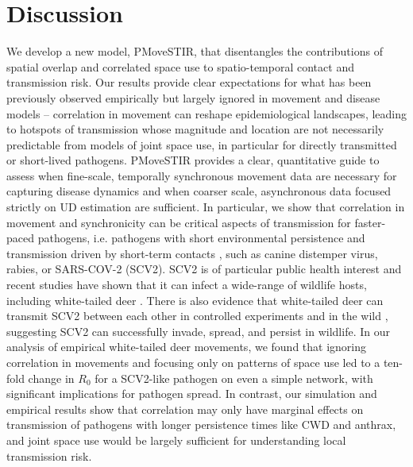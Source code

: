 \documentclass[letterpaper]{article}
\begin{document}
\section*{Discussion}

We develop a new model, PMoveSTIR, that disentangles the contributions of spatial overlap and correlated space use to spatio-temporal contact and transmission risk. Our results provide clear expectations for what has been previously observed empirically but largely ignored in movement and disease models -- correlation in movement can reshape epidemiological landscapes, leading to hotspots of transmission whose magnitude and location are not necessarily predictable from models of joint space use, in particular for directly transmitted or short-lived pathogens.  
PMoveSTIR provides a clear, quantitative guide to assess when fine-scale, temporally synchronous movement data are necessary for capturing disease dynamics and when coarser scale, asynchronous data focused strictly on UD estimation are sufficient. 
In particular, we show that correlation in movement and synchronicity can be critical aspects of transmission for faster-paced pathogens, i.e. pathogens with short environmental persistence and transmission driven by short-term contacts \citep[cf.][]{Dougherty2018,Manlove2022}, such as canine distemper virus, rabies, or SARS-COV-2 (SCV2). 
SCV2 is of particular public health interest and recent studies have shown that it can infect a wide-range of wildlife hosts, including white-tailed deer \citep{Palmer2021,Hale2022}. There is also evidence that white-tailed deer can transmit SCV2 between each other in controlled experiments and in the wild \citep{Martins2022,Hale2022}, suggesting SCV2 can successfully invade, spread, and persist in wildlife.  In our analysis of empirical white-tailed deer movements, we found that ignoring correlation in movements and focusing only on patterns of space use led to a ten-fold change in $R_0$ for a SCV2-like pathogen on even a simple network, with significant implications for pathogen spread.  In contrast, our simulation and empirical results show that correlation may only have marginal effects on transmission of pathogens with longer persistence times like CWD and anthrax, and joint space use would be largely sufficient for understanding local transmission risk.
\end{document}
